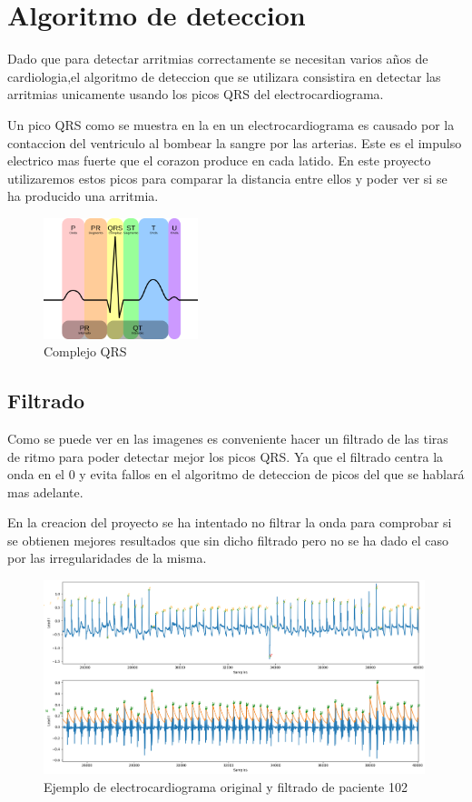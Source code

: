 \section{Algoritmo de deteccion}
Dado que para detectar arritmias correctamente se necesitan varios años de cardiologia,el algoritmo de 
deteccion que se utilizara consistira en detectar las arritmias unicamente usando los picos QRS del electrocardiograma.

Un pico QRS como se muestra en la  en un electrocardiograma es causado por la contaccion del ventriculo al bombear la sangre por las arterias.
Este es el impulso electrico mas fuerte que el corazon produce en cada latido. En este proyecto utilizaremos estos picos
para comparar la distancia entre ellos y poder ver si se ha producido una arritmia. 

\begin{figure}[h]
	\centering
	\includegraphics[width=0.4\textwidth]{./Images/img_introduccion/complejoQRS.png}
	\caption{Complejo QRS}
	\label{fig:complejoQRS}
\end{figure}

\subsection{Filtrado}
Como se puede ver en las imagenes es conveniente hacer un filtrado de las tiras de ritmo para poder detectar mejor
los picos QRS. Ya que el filtrado centra la onda en el 0 y evita fallos en el algoritmo de deteccion de picos del 
que se hablará mas adelante. 

En la creacion del proyecto se ha intentado no filtrar la onda para comprobar si se obtienen mejores resultados que
sin dicho filtrado pero no se ha dado el caso por las irregularidades de la misma.

\begin{figure}[h!]
	\centering
	\includegraphics[width=0.99\textwidth]{./Images/img_introduccion/102filtrado_y_sin_filtrar.png}
	\caption{Ejemplo de electrocardiograma original y filtrado de paciente 102}
	\label{fig:102filtradoysinfiltrar}
\end{figure}

